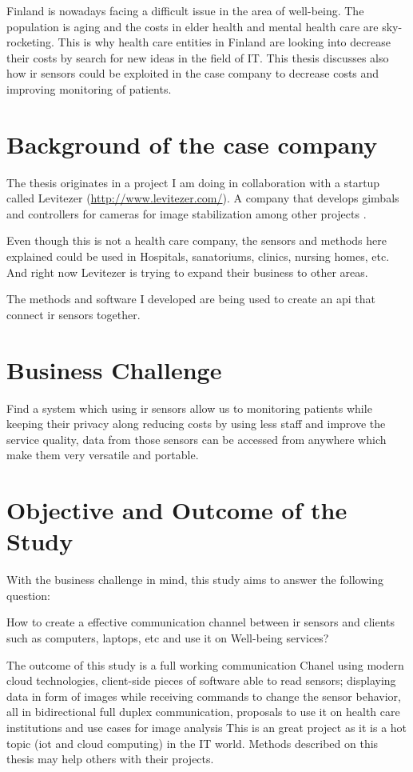 \documentclass[hidelinks,11pt,a4paper,oneside,article]{memoir}
\begin{document}
Finland is nowadays facing a difficult issue in the area of well-being. The population is aging and the costs in elder health and mental health care are sky-rocketing. This is why health care entities in Finland are looking into decrease their costs by search for new ideas in the field of IT.
This thesis discusses also how \gls{ir} sensors could be exploited in the case company to decrease costs and improving monitoring of patients.

\section{Background of the case company}
The thesis originates in a project I am doing in collaboration with a startup called Levitezer (\url{http://www.levitezer.com/}). A company that develops gimbals and controllers for cameras for image stabilization among other projects \cite{levitezer}.

Even though this is not a health care company, the sensors and methods here explained could be used in Hospitals, sanatoriums, clinics, nursing homes, etc. And right now Levitezer is trying to expand their business to other areas.

The methods and software I developed are being used to create an \gls{api} that connect \gls{ir} sensors together.

\section{Business Challenge}
Find a system which using \gls{ir} sensors allow us to monitoring patients while keeping their privacy along reducing costs by using less staff and improve the service quality, data from those sensors can be accessed from anywhere which make them very versatile and portable.
\section{Objective and Outcome of the Study}
With the business challenge in mind, this study aims to answer the following question:
\begin{displayquote}
{\large  How to create a effective communication channel between ir sensors and clients such as computers, laptops, etc and use it on Well-being services?}
\end{displayquote}

The outcome of this study is a full working communication Chanel using modern cloud technologies, client-side pieces of software able to read sensors; displaying data in form of images while receiving commands to change the sensor behavior, all in bidirectional full duplex communication, proposals to use it on health care institutions and use cases for image analysis
This is an great project as it is a hot topic (\gls{iot} and cloud computing) in the IT world. Methods described on this thesis may help others with their projects.
\end{document}
